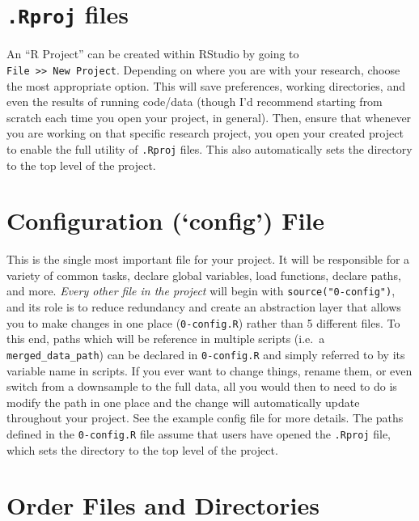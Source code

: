 \documentclass[]{book}
\begin{document}
\section{\texorpdfstring{\texttt{.Rproj}
files}{.Rproj files}}\label{rproj-files}

An ``R Project'' can be created within RStudio by going to
\texttt{File\ \textgreater{}\textgreater{}\ New\ Project}. Depending on
where you are with your research, choose the most appropriate option.
This will save preferences, working directories, and even the results of
running code/data (though I'd recommend starting from scratch each time
you open your project, in general). Then, ensure that whenever you are
working on that specific research project, you open your created project
to enable the full utility of \texttt{.Rproj} files. This also
automatically sets the directory to the top level of the project.

\section{\texorpdfstring{Configuration (`config')
File}{Configuration (config) File}}\label{configuration-config-file}

This is the single most important file for your project. It will be
responsible for a variety of common tasks, declare global variables,
load functions, declare paths, and more. \emph{Every other file in the
project} will begin with \texttt{source("0-config")}, and its role is to
reduce redundancy and create an abstraction layer that allows you to
make changes in one place (\texttt{0-config.R}) rather than 5 different
files. To this end, paths which will be reference in multiple scripts
(i.e.~a \texttt{merged\_data\_path}) can be declared in
\texttt{0-config.R} and simply referred to by its variable name in
scripts. If you ever want to change things, rename them, or even switch
from a downsample to the full data, all you would then to need to do is
modify the path in one place and the change will automatically update
throughout your project. See the example config file for more details.
The paths defined in the \texttt{0-config.R} file assume that users have
opened the \texttt{.Rproj} file, which sets the directory to the top
level of the project.

\section{Order Files and Directories}\label{order-files-and-directories}
\end{document}
